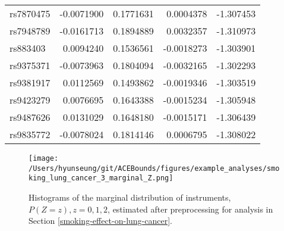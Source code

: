 \documentclass[
]{article}
\theoremstyle{plain}
\begin{document}
\begin{longtable}[t]{lrrrr}
rs7870475 & -0.0071900 & 0.1771631 & 0.0004378 & -1.307453\\
rs7948789 & -0.0161713 & 0.1894889 & 0.0032357 & -1.310973\\
rs883403 & 0.0094240 & 0.1536561 & -0.0018273 & -1.303901\\
rs9375371 & -0.0073963 & 0.1804094 & -0.0032165 & -1.302293\\
\addlinespace
rs9381917 & 0.0112569 & 0.1493862 & -0.0019346 & -1.303519\\
rs9423279 & 0.0076695 & 0.1643388 & -0.0015234 & -1.305948\\
rs9487626 & 0.0131029 & 0.1648180 & -0.0015171 & -1.306439\\
rs9835772 & -0.0078024 & 0.1814146 & 0.0006795 & -1.308022\\*
\end{longtable}

\begin{figure}[H]
  \center
  \texttt{[image: /Users/hyunseung/git/ACEBounds/figures/example\_analyses/smoking\_lung\_cancer\_3\_marginal\_Z.png]}
  \caption{Histograms of the marginal distribution of instruments, $P(Z = z), z=0,1,2$, estimated after preprocessing for analysis in Section \ref{smoking-effect-on-lung-cancer}.}
  \label{fig:marginal-distribution-of-instruments-lung-cancer}
\end{figure}
\end{document}
